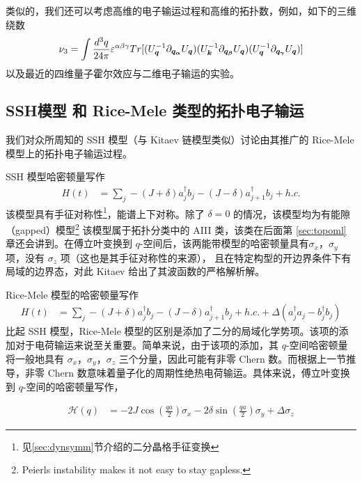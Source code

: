 类似的，我们还可以考虑高维的电子输运过程和高维的拓扑数，例如，如下的三维绕数
\begin{align}
\nu_3=\int\dfrac{d^3q}{24\pi}\varepsilon^{\alpha\beta\gamma}Tr[(U_{\boldsymbol{q}}^{-1}\partial_{\boldsymbol{q_{\alpha}}}U_{\boldsymbol{q}})(U_{\boldsymbol{k}}^{-1}\partial_{\boldsymbol{q_{\beta}}}U_{\boldsymbol{q}})(U_{\boldsymbol{q}}^{-1}\partial_{\boldsymbol{q_{\gamma}}}U_{\boldsymbol{q}})]
\end{align}
以及最近的四维量子霍尔效应与二维电子输运的实验\cite{4dqhall-expr-2018}。


\subsection{SSH模型 和 Rice-Mele 类型的拓扑电子输运}\label{sec:ssh}

我们对众所周知的 SSH 模型\cite{ssh1979}（与 Kitaev 链模型\cite{kitaev2001}类似）讨论由其推广的 Rice-Mele 模型上的拓扑电子输运过程。

SSH 模型哈密顿量写作
\begin{align}
H(t) &=\sum_j-(J+\delta)a_j^{\dagger}b_j-(J-\delta)a_{j+1}^{\dagger}b_j+h.c.
\end{align}
该模型具有手征对称性\footnote{见\ref{sec:dynsymm}节介绍的二分晶格手征变换}，能谱上下对称。除了 $\delta=0$ 的情况，该模型均为有能隙（gapped）模型\footnote{Peierls instability makes it not easy to stay gapless.}
该模型属于拓扑分类\cite{topoclassify2016}中的 AIII 类，该类在后面第 \ref{sec:topoml} 章还会讲到。在傅立叶变换到 $q$-空间后，该两能带模型的哈密顿量具有$\sigma_x$，$\sigma_y$ 项，没有 $\sigma_z$ 项（这也是其手征对称性的来源）， 且在特定构型的开边界条件下有局域的边界态，对此 Kitaev 给出了其波函数的严格解析解\cite{kitaev2001}。

Rice-Mele 模型的哈密顿量写作
\begin{align}
H(t) &=\sum_j-(J+\delta)a_j^{\dagger}b_j-(J-\delta)a_{j+1}^{\dagger}b_j+h.c.+\Delta(a_j^{\dagger}a_j-b_j^{\dagger}b_j)
\end{align}
比起 SSH 模型，Rice-Mele 模型的区别是添加了二分的局域化学势项。该项的添加对于电荷输运来说至关重要。简单来说，由于该项的添加，其 $q$-空间哈密顿量将一般地具有 $\sigma_x$，$\sigma_y$，$\sigma_z$ 三个分量，因此可能有非零 Chern 数。而根据上一节推导，非零 Chern 数意味着量子化的周期性绝热电荷输运。具体来说，傅立叶变换到 $q$-空间的哈密顿量写作，

\begin{align}
\mathcal{H}(q)
&=-2J\cos(\frac{qa}{2})\sigma_x-2\delta\sin(\frac{qa}{2})\sigma_y+\Delta\sigma_z
\end{align}

